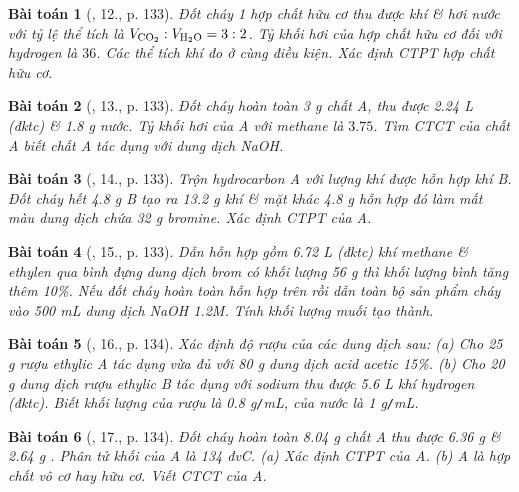 \documentclass{article}
\newtheorem{baitoan}{Bài toán}
\begin{document}
\begin{baitoan}[\cite{An_Hoa_Hoc_nang_cao_8_9}, 12., p. 133]
	Đốt cháy 1 hợp chất hữu cơ thu được khí {\rm{}} \& hơi nước với tỷ lệ thể tích là $V_{\ce{CO2}}:V_{\ce{H2O}} = 3:2$. Tỷ khối hơi của hợp chất hữu cơ đối với hydrogen là $36$. Các thể tích khí đo ở cùng điều kiện. Xác định {\rm CTPT} hợp chất hữu cơ.
\end{baitoan}

\begin{baitoan}[\cite{An_Hoa_Hoc_nang_cao_8_9}, 13., p. 133]
	Đốt cháy hoàn toàn {\rm3 g} chất A, thu được {\rm2.24 L } (đktc) \& {\rm 1.8 g} nước. Tỷ khối hơi của A với methane là $3.75$. Tìm {\rm CTCT} của chất A biết chất A tác dụng với dung dịch {\rm NaOH}.
\end{baitoan}

\begin{baitoan}[\cite{An_Hoa_Hoc_nang_cao_8_9}, 14., p. 133]
	Trộn hydrocarbon A với lượng khí {\rm{}} được hỗn hợp khí B. Đốt cháy hết {\rm4.8 g} B tạo ra {\rm13.2 g} khí {\rm{}} \& mặt khác {\rm4.8 g} hỗn hợp đó làm mất màu dung dịch chứa {\rm32 g} bromine. Xác định {\rm CTPT} của A.
\end{baitoan}

\begin{baitoan}[\cite{An_Hoa_Hoc_nang_cao_8_9}, 15., p. 133]
	Dẫn hỗn hợp gồm {\rm6.72 L} (đktc) khí methane \& ethylen qua bình đựng dung dịch brom có khối lượng {\rm56 g} thì khối lượng bình tăng thêm {\rm10\%}. Nếu đốt cháy hoàn toàn hỗn hợp trên rồi dẫn toàn bộ sản phẩm cháy vào {\rm500 mL} dung dịch {\rm NaOH 1.2M}. Tính khối lượng muối tạo thành.
\end{baitoan}

\begin{baitoan}[\cite{An_Hoa_Hoc_nang_cao_8_9}, 16., p. 134]
	Xác định độ rượu của các dung dịch sau: (a) Cho {\rm25 g} rượu ethylic A tác dụng vừa đủ với {\rm80 g} dung dịch acid acetic {\rm15\%}. (b) Cho {\rm20 g} dung dịch rượu ethylic B tác dụng với sodium thu được {\rm5.6 L} khí hydrogen (đktc). Biết khối lượng của rượu là {\rm0.8 g{\tt/}mL}, của nước là {\rm1 g{\tt/}mL}.
\end{baitoan}

\begin{baitoan}[\cite{An_Hoa_Hoc_nang_cao_8_9}, 17., p. 134]
	Đốt cháy hoàn toàn {\rm8.04 g} chất A thu được {\rm6.36 g } \& {\rm2.64 g }. Phân tử khối của A là {\rm134 đvC}. (a) Xác định {\rm CTPT} của A. (b) A là hợp chất vô cơ hay hữu cơ. Viết {\rm CTCT} của A.
\end{baitoan}
\end{document}
